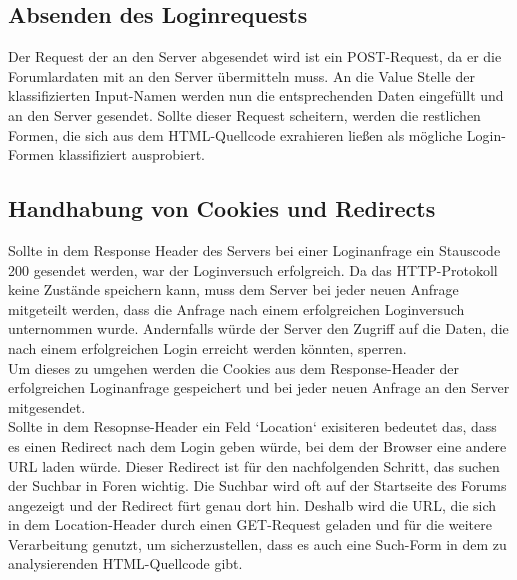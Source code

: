 \subsection{Absenden des Loginrequests}
Der Request der an den Server abgesendet wird ist ein POST-Request, da er die Forumlardaten mit an den Server übermitteln muss.
An die Value Stelle der klassifizierten Input-Namen werden nun die entsprechenden Daten eingefüllt und an den Server gesendet.
Sollte dieser Request scheitern, werden die restlichen Formen, die sich aus dem HTML-Quellcode exrahieren ließen als mögliche Login-Formen klassifiziert ausprobiert.
\subsection{Handhabung von Cookies und Redirects}
Sollte in dem Response Header des Servers bei einer Loginanfrage ein Stauscode 200 gesendet werden, war der Loginversuch erfolgreich. Da das HTTP-Protokoll keine Zustände speichern kann, muss dem Server bei jeder neuen Anfrage mitgeteilt werden, dass die Anfrage nach einem erfolgreichen Loginversuch unternommen wurde. Andernfalls würde der Server den Zugriff auf die Daten, die nach einem erfolgreichen Login erreicht werden könnten, sperren.\\
Um dieses zu umgehen werden die Cookies aus dem Response-Header der erfolgreichen Loginanfrage gespeichert und bei jeder neuen Anfrage an den Server mitgesendet.\\
Sollte in dem Resopnse-Header ein Feld `Location` exisiteren bedeutet das, dass es einen Redirect nach dem Login geben würde, bei dem der Browser eine andere URL laden würde. Dieser Redirect ist für den nachfolgenden Schritt, das suchen der Suchbar in Foren wichtig. Die Suchbar wird oft auf der Startseite des Forums angezeigt und der Redirect fürt genau dort hin. Deshalb wird die URL, die sich in dem Location-Header durch einen GET-Request geladen und für die weitere Verarbeitung genutzt, um sicherzustellen, dass es auch eine Such-Form in dem zu analysierenden HTML-Quellcode gibt.
\newpage

